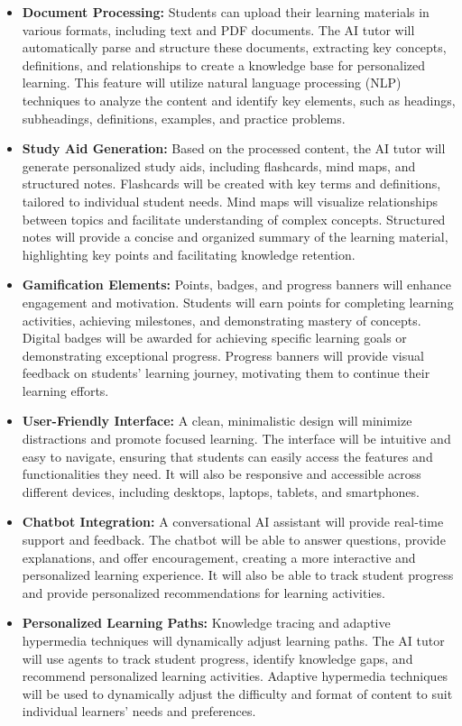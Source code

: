 \documentclass[
	letterpaper, %
]{jdf}
\begin{document}
\begin{itemize}
    \item \textbf{Document Processing:} Students can upload their learning materials in various formats, including text and PDF documents. The AI tutor will automatically parse and structure these documents, extracting key concepts, definitions, and relationships to create a knowledge base for personalized learning. This feature will utilize natural language processing (NLP) techniques to analyze the content and identify key elements, such as headings, subheadings, definitions, examples, and practice problems.
    \item \textbf{Study Aid Generation:} Based on the processed content, the AI tutor will generate personalized study aids, including flashcards, mind maps, and structured notes. Flashcards will be created with key terms and definitions, tailored to individual student needs. Mind maps will visualize relationships between topics and facilitate understanding of complex concepts. Structured notes will provide a concise and organized summary of the learning material, highlighting key points and facilitating knowledge retention.
    \item \textbf{Gamification Elements:} Points, badges, and progress banners will enhance engagement and motivation. Students will earn points for completing learning activities, achieving milestones, and demonstrating mastery of concepts. Digital badges will be awarded for achieving specific learning goals or demonstrating exceptional progress. Progress banners will provide visual feedback on students' learning journey, motivating them to continue their learning efforts.
    \item \textbf{User-Friendly Interface:} A clean, minimalistic design will minimize distractions and promote focused learning. The interface will be intuitive and easy to navigate, ensuring that students can easily access the features and functionalities they need. It will also be responsive and accessible across different devices, including desktops, laptops, tablets, and smartphones.
    \item \textbf{Chatbot Integration:} A conversational AI assistant will provide real-time support and feedback. The chatbot will be able to answer questions, provide explanations, and offer encouragement, creating a more interactive and personalized learning experience. It will also be able to track student progress and provide personalized recommendations for learning activities.
    \item \textbf{Personalized Learning Paths:} Knowledge tracing and adaptive hypermedia techniques will dynamically adjust learning paths. The AI tutor will use agents to track student progress, identify knowledge gaps, and recommend personalized learning activities. Adaptive hypermedia techniques will be used to dynamically adjust the difficulty and format of content to suit individual learners' needs and preferences.
\end{itemize}
\end{document}
